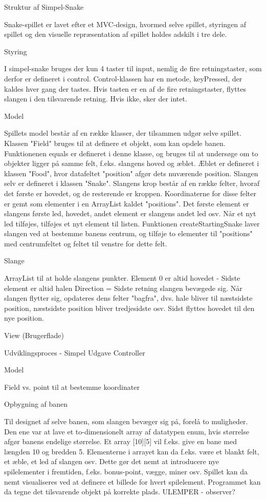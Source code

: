 Struktur af Simpel-Snake

Snake-spillet er lavet efter et MVC-design, hvormed selve spillet, styringen af spillet og den visuelle repræsentation af spillet holdes adskilt i tre dele.

Styring

I simpel-snake bruges der kun 4 taster til input, nemlig de fire retningstaster, som derfor er defineret i control. Control-klassen har en metode, keyPressed, der kaldes hver gang der tastes. Hvis tasten er en af de fire retningstaster, flyttes slangen i den tilsvarende retning. Hvis ikke, sker der intet.

Model

Spillets model består af en række klasser, der tilsammen udgør selve spillet.
Klassen "Field" bruges til at definere et objekt, som kan opdele banen. Funktionenen equals er defineret i denne klasse, og bruges til at undersøge om to objekter ligger på samme felt, f.eks. slangens hoved og æblet. Æblet er defineret i klassen "Food", hvor datafeltet "position" afgør dets nuværende position. 
Slangen selv er defineret i klassen "Snake". Slangens krop består af en række felter, hvoraf det første er hovedet, og de resterende er kroppen. Koordinaterne for disse felter er gemt som elementer i en ArrayList kaldet "positions". Det første element er slangens første led, hovedet, andet element er slangens andet led osv. Når et nyt led tilføjes, tilføjes et nyt element til listen. Funktionen createStartingSnake laver slangen ved at bestemme banens centrum, og tilføje to elementer til "positions" med centrumfeltet og feltet til venstre for dette felt.

Slange

	ArrayList til at holde slangens punkter.
	Element 0 er altid hovedet - Sidste element er altid halen
	Direction = Sidste retning slangen bevægede sig.
	Når slangen flytter sig, opdateres dens felter "bagfra", dvs. hale bliver til næstsidste 	position, næstsidste position bliver tredjesidste osv. Sidst flyttes hovedet til den nye 	position.
	
View (Brugerflade)
	
Udviklingsproces - Simpel Udgave
Controller
	
Model

Field vs. point til at bestemme koordinater
	
Opbygning af banen

Til designet af selve banen, som slangen bevæger sig på, forelå to muligheder. Den ene var at lave et to-dimensionelt array af datatypen enum, hvis størrelse afgør banens endelige størrelse. Et array [10][5] vil f.eks. give en bane med længden 10 og bredden 5. Elementerne i arrayet kan da f.eks. være et blankt felt, et æble, et led af slangen osv. Dette gør det nemt at introducere nye spilelementer i fremtiden, f.eks. bonus-point, vægge, miner osv. Spillet kan da nemt visualiseres ved at definere et billede for hvert spilelement. Programmet kan da tegne det tilsvarende objekt på korrekte plads.
ULEMPER - observer?

